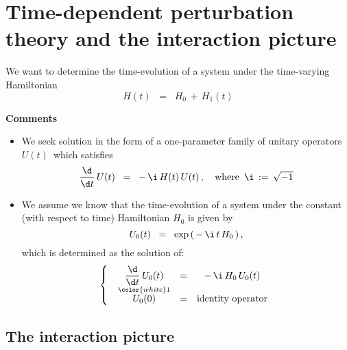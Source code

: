 

\chapter{Time-dependent perturbation theory and the interaction picture}
\setcounter{theorem}{0}
\setcounter{equation}{0}


\renewcommand{\theenumi}{\roman{enumi}}
\renewcommand{\labelenumi}{\textnormal{(\theenumi)}$\;\;$}


We want to determine the time-evolution of a system under the time-varying Hamiltonian
\begin{equation*}
H(t) \;\; = \;\; H_{0} \,+\, H_{1}(t)
\end{equation*}

\vskip 0.5cm
\noindent
\textbf{Comments}
\begin{itemize}
\item
	We seek solution in the form of a one-parameter family of unitary operators
	\,$U(t)$\, which satisfies
	\begin{equation*}
	\dfrac{\d}{\d t}\,U(t) \;\; = \;\; -\,\i\,H(t)\,U(t)\,,
	\quad
	\textnormal{where \,$\i \,:=\, \sqrt{-1}$}
	\end{equation*}
\item
	We assume we know that the time-evolution of a system under the constant (with respect to time)
	Hamiltonian $H_{0}$ is given by
	\begin{equation*}
	U_{0}(t) \;\; = \;\; \exp\left(\,-\,\i\,t\,H_{0}\,\right),
	\end{equation*}
	which is determined as the solution of:
	\begin{equation*}
	\left\{\;\;
		\begin{array}{ccc}
		\dfrac{\d}{\d t}\,U_{0}(t) & = & -\,\i\,H_{0}\,U_{0}(t)
		\\
		\overset{{\color{white}1}}{U_{0}(0)} & = & \textnormal{identity operator}
		\end{array}
		\right.
	\end{equation*}
\end{itemize}


\vskip 0.5cm
\section{The interaction picture}

